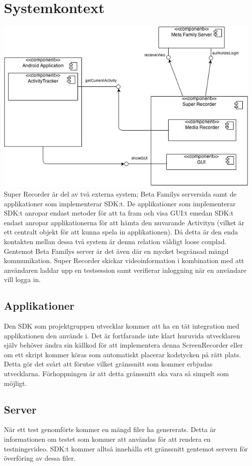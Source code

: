 \section{Systemkontext}
\includegraphics{UML3.jpg}
Super Recorder är del av två externa system; Beta Familys serversida samt de applikationer som implementerar SDK:t. De applikationer som implementerar SDK:t anropar endast metoder för att ta fram och visa GUI:t emedan SDK:t endast anropar applikationerna för att hämta den nuvarande Activityn (vilket är ett centralt objekt för att kunna spela in applikationen). Då detta är den enda kontakten mellan dessa två system är denna relation väldigt loose couplad. 
Gentemot Beta Familys server är det även där en mycket begränsad mängd kommunikation. Super Recorder skickar videoinformation i kombination med att användaren laddar upp en testsession samt verifierar inloggning när en användare vill logga in. 

\subsection{Applikationer}
Den SDK som projektgruppen utvecklar kommer att ha en tät integration med applikationen den används i. Det är fortfarande inte klart huruvida utvecklaren själv behöver ändra sin källkod för att implementera denna ScreenRecorder eller om ett skript kommer köras som automatiskt placerar kodstycken på rätt plats. Detta gör det svårt att förutse vilket gränssnitt som kommer erbjudas utvecklarna. Förhoppningen är att detta gränssnitt ska vara så simpelt som möjligt.

\subsection{Server}
När ett test genomförts kommer en mängd filer ha genererats. Detta är informationen om testet som kommer att användas för att rendera en testningsvideo. SDK:t kommer alltså innehålla ett gränssnitt gentemot servern för överföring av dessa filer. 